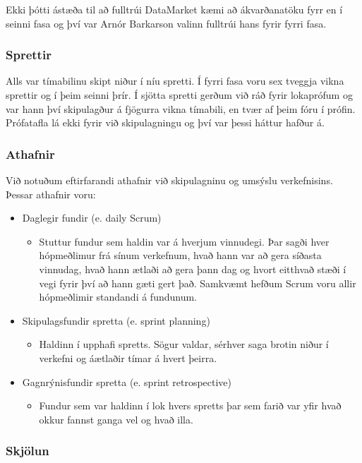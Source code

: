 \documentclass{article}
\begin{document}
Ekki þótti ástæða til að fulltrúi 
DataMarket kæmi að ákvarðanatöku fyrr en í seinni fasa og því var Arnór Barkarson 
valinn fulltrúi hans fyrir fyrri fasa.

\subsubsection{Sprettir}
\label{sec:sprettir}
Alls var tímabilinu skipt niður í níu spretti. Í fyrri fasa voru sex 
tveggja vikna sprettir og í þeim seinni þrír. Í sjötta spretti gerðum við ráð fyrir lokaprófum og var hann því
skipulagður á fjögurra vikna tímabili, 
en tvær af þeim fóru í prófin. Prófatafla lá ekki fyrir við skipulagningu og því 
var þessi háttur hafður á. 

\subsubsection{Athafnir}

Við notuðum eftirfarandi athafnir við skipulagninu og umsýslu verkefnisins.
Þessar athafnir voru: 

\begin{itemize}
\item Daglegir fundir (e. daily Scrum)
  \begin{itemize}
  \item Stuttur fundur sem haldin var á hverjum vinnudegi. Þar sagði hver hópmeðlimur frá sínum verkefnum, hvað hann var að gera síðasta vinnudag, hvað hann ætlaði að gera þann dag og hvort eitthvað stæði í vegi fyrir því að hann gæti gert það. Samkvæmt hefðum Scrum voru allir hópmeðlimir standandi á fundunum.
  \end{itemize}
\item Skipulagsfundir spretta (e. sprint planning)
  \begin{itemize}
  \item Haldinn í upphafi spretts. Sögur valdar, sérhver saga brotin niður í verkefni og áætlaðir tímar á hvert þeirra. 
  \end{itemize}
\item Gagnrýnisfundir spretta (e. sprint retrospective)
  \begin{itemize}
  \item Fundur sem var haldinn í lok hvers spretts þar sem farið var yfir hvað okkur fannst ganga vel og hvað illa. 
  \end{itemize}
\end{itemize}

\subsubsection{Skjölun}
\end{document}
